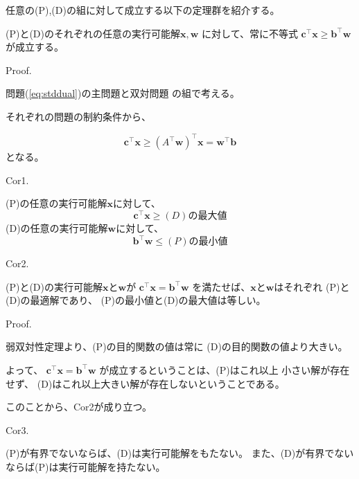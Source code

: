 \documentclass[9pt]{ltjsreport}
\begin{document}
任意の(P),(D)の組に対して成立する以下の定理群を紹介する。
\begin{tcolorbox}[title=弱双対定理]
    (P)と(D)のそれぞれの任意の実行可能解$\bm{x},\bm{w}$
    に対して、常に不等式
    $\bm{c}^\top\bm{x}\ge\bm{b}^\top\bm{w}$
    が成立する。

    \hrulefill

    Proof.
    
    問題(\ref{eq:stddual})の主問題と双対問題
    の組で考える。

    それぞれの問題の制約条件から、

    \begin{equation*}
        \bm{c}^\top \bm{x}\ge (A^\top \bm{w})^\top \bm{x}
        =\bm{w}^\top\bm{b}
    \end{equation*}
    となる。
    
    \hrulefill

    Cor1.

    (P)の任意の実行可能解$\bm{x}$に対して、
    \begin{equation*}
        \bm{c}^\top\bm{x}\ge (D)\text{の最大値}
    \end{equation*}
    (D)の任意の実行可能解$\bm{w}$に対して、
    \begin{equation*}
        \bm{b}^\top\bm{w}\le(P)\text{の最小値}
    \end{equation*}    
    \hrulefill

    Cor2.

    (P)と(D)の実行可能解$\bm{x}$と$\bm{w}$が
    $\bm{c}^\top\bm{x}=\bm{b}^\top\bm{w}$
    を満たせば、$\bm{x}$と$\bm{w}$はそれぞれ
    (P)と(D)の最適解であり、
    (P)の最小値と(D)の最大値は等しい。

    \hrulefill

    Proof.

    弱双対性定理より、(P)の目的関数の値は常に
    (D)の目的関数の値より大きい。

    よって、
    $\bm{c}^\top\bm{x}=\bm{b}^\top\bm{w}$
    が成立するということは、(P)はこれ以上
    小さい解が存在せず、
    (D)はこれ以上大きい解が存在しないということである。

    このことから、Cor2が成り立つ。
    
    \hrulefill

    Cor3.

    (P)が有界でないならば、(D)は実行可能解をもたない。
    また、(D)が有界でないならば(P)は実行可能解を持たない。
\end{tcolorbox}
\end{document}
